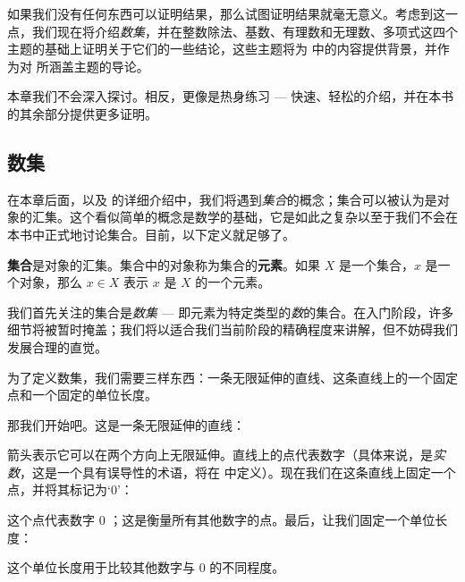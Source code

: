 如果我们没有任何东西可以证明结果，那么试图证明结果就毫无意义。考虑到这一点，我们现在将介绍\textit{数集}，并在整数除法、基数、有理数和无理数、多项式这四个主题的基础上证明关于它们的一些结论，这些主题将为  中的内容提供背景，并作为对  所涵盖主题的导论。

本章我们不会深入探讨。相反，更像是热身练习 --- 快速、轻松的介绍，并在本书的其余部分提供更多证明。

\subsection*{数集}

在本章后面，以及  的详细介绍中，我们将遇到\textit{集合}的概念；集合可以被认为是对象的汇集。这个看似简单的概念是数学的基础，它是如此之复杂以至于我们不会在本书中正式地讨论集合。目前，以下定义就足够了。

\begin{definition}
\label{defSetsPreliminary}
\textbf{集合}是对象的汇集。集合中的对象称为集合的\textbf{元素}。如果 $X$ 是一个集合，$x$ 是一个对象，那么 $x \in X$  表示 $x$ 是 $X$ 的一个元素。
\end{definition}

我们首先关注的集合是\textit{数集} --- 即元素为特定类型的\textit{数}的集合。在入门阶段，许多细节将被暂时掩盖；我们将以适合我们当前阶段的精确程度来讲解，但不妨碍我们发展合理的直觉。

为了定义数集，我们需要三样东西：一条无限延伸的直线、这条直线上的一个固定点和一个固定的单位长度。

那我们开始吧。这是一条无限延伸的直线：
\begin{center}
\end{center}
箭头表示它可以在两个方向上无限延伸。直线上的点代表数字（具体来说，是\textit{实数}，这是一个具有误导性的术语，将在  中定义）。现在我们在这条直线上固定一个点，并将其标记为`$0$'：
\begin{center}
\end{center}
这个点代表数字 0 ；这是衡量所有其他数字的点。最后，让我们固定一个单位长度：
\begin{center}
\end{center}
这个单位长度用于比较其他数字与 0 的不同程度。

